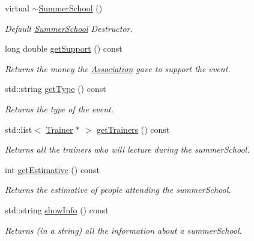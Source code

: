 \begin{DoxyCompactItemize}
virtual \hyperlink{classSummerSchool_ad3c3df760cfaee1042fe5290fa487b2c}{$\sim$\+Summer\+School} ()
\begin{DoxyCompactList}\small\item\em Default \hyperlink{classSummerSchool}{Summer\+School} Destructor. \end{DoxyCompactList}\item 
long double \hyperlink{classSummerSchool_a86f34a2f39dcd33171e77c386165219c}{get\+Support} () const
\begin{DoxyCompactList}\small\item\em Returns the money the \hyperlink{classAssociation}{Association} gave to support the event. \end{DoxyCompactList}\item 
std\+::string \hyperlink{classSummerSchool_a2ba547411ca8f161c2c579f9f55f913e}{get\+Type} () const
\begin{DoxyCompactList}\small\item\em Returns the type of the event. \end{DoxyCompactList}\item 
std\+::list$<$ \hyperlink{classTrainer}{Trainer} $\ast$ $>$ \hyperlink{classSummerSchool_aba18410ee9fbafd26858232104b5b39f}{get\+Trainers} () const
\begin{DoxyCompactList}\small\item\em Returns all the trainers who will lecture during the summer\+School. \end{DoxyCompactList}\item 
int \hyperlink{classSummerSchool_a019b9e38108b7dd31cd93cab285d0d00}{get\+Estimative} () const
\begin{DoxyCompactList}\small\item\em Returns the estimative of people attending the summer\+School. \end{DoxyCompactList}\item 
std\+::string \hyperlink{classSummerSchool_a61ac7307840f787e3de639d431248e26}{show\+Info} () const
\begin{DoxyCompactList}\small\item\em Returns (in a string) all the information about a summer\+School. \end{DoxyCompactList}\end{DoxyCompactItemize}
